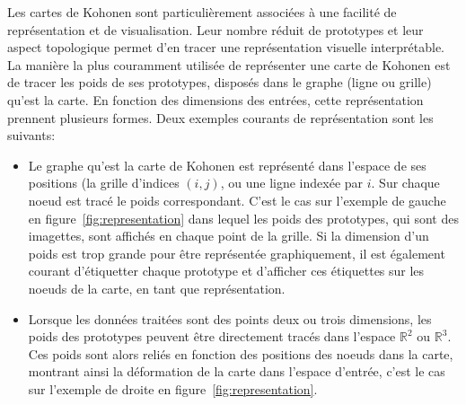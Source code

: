 Les cartes de Kohonen sont particulièrement associées à une facilité de représentation et de visualisation. Leur nombre réduit de prototypes et leur aspect topologique permet d'en tracer une représentation visuelle interprétable.
La manière la plus couramment utilisée de représenter une carte de Kohonen est de tracer les poids de ses prototypes, disposés dans le graphe (ligne ou grille) qu'est la carte. En fonction des dimensions des entrées, cette représentation prennent plusieurs formes. Deux exemples courants de représentation sont les suivants: 
\begin{itemize}
\item Le graphe qu'est la carte de Kohonen est représenté dans l'espace de ses positions (la grille d'indices $(i,j)$, ou une ligne indexée par $i$. Sur chaque noeud est tracé le poids correspondant. C'est le cas sur l'exemple de gauche en figure~\ref{fig:representation} dans lequel les poids des prototypes, qui sont des imagettes, sont affichés en chaque point de la grille. Si la dimension d'un poids est trop grande pour être représentée graphiquement, il est également courant d'étiquetter chaque prototype et d'afficher ces étiquettes sur les noeuds de la carte, en tant que représentation.
\item Lorsque les données traitées sont des points deux ou trois dimensions, les poids des prototypes peuvent être directement tracés dans l'espace $\mathbb{R}^2$ ou $\mathbb{R}^3$. Ces poids sont alors reliés en fonction des positions des noeuds dans la carte, montrant ainsi la déformation de la carte dans l'espace d'entrée, c'est le cas sur l'exemple de droite en figure~\ref{fig:representation}.
\end{itemize}

